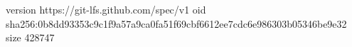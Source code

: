 version https://git-lfs.github.com/spec/v1
oid sha256:0b8dd93353c9c1f9a57a9ca0fa51f69cbf6612ee7cdc6e986303b05346be9e32
size 428747
